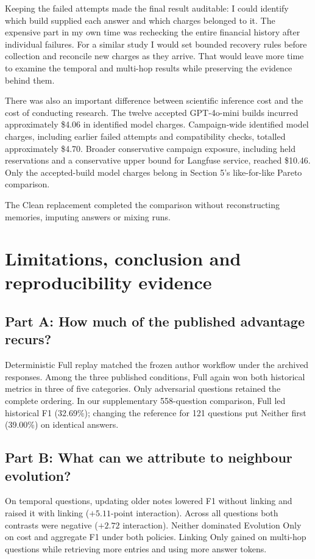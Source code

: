 \documentclass[11pt,a4paper]{article}
\begin{document}
Keeping the failed attempts made the final result auditable: I could identify which build supplied each answer and which charges belonged to it. The expensive part in my own time was rechecking the entire financial history after individual failures. For a similar study I would set bounded recovery rules before collection and reconcile new charges as they arrive. That would leave more time to examine the temporal and multi-hop results while preserving the evidence behind them.

There was also an important difference between scientific inference cost and the cost of conducting research. The twelve accepted GPT-4o-mini builds incurred approximately \$4.06 in identified model charges. Campaign-wide identified model charges, including earlier failed attempts and compatibility checks, totalled approximately \$4.70. Broader conservative campaign exposure, including held reservations and a conservative upper bound for Langfuse service, reached \$10.46. Only the accepted-build model charges belong in Section 5’s like-for-like Pareto comparison.

The Clean replacement completed the comparison without reconstructing memories, imputing answers or mixing runs.

\section{Limitations, conclusion and reproducibility evidence}
\subsection{Part A: How much of the published advantage recurs?}
Deterministic Full replay matched the frozen author workflow under the archived responses. Among the three published conditions, Full again won both historical metrics in three of five categories. Only adversarial questions retained the complete ordering. In our supplementary 558-question comparison, Full led historical F1 (32.69\%); changing the reference for 121 questions put Neither first (39.00\%) on identical answers.

\subsection{Part B: What can we attribute to neighbour evolution?}
On temporal questions, updating older notes lowered F1 without linking and raised it with linking ($+5.11$-point interaction). Across all questions both contrasts were negative ($+2.72$ interaction). Neither dominated Evolution Only on cost and aggregate F1 under both policies. Linking Only gained on multi-hop questions while retrieving more entries and using more answer tokens.
\end{document}
